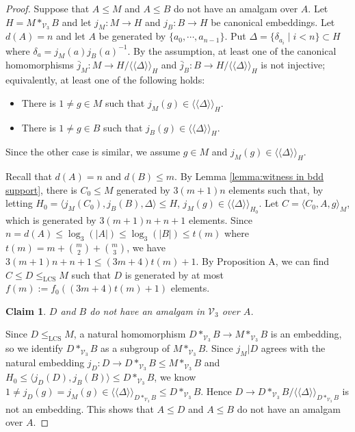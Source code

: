 \documentclass[11pt,reqno]{article}
\newtheorem{claim}{Claim}[theorem]
\theoremstyle{definition}
\theoremstyle{remark}
\newcommand{\LCS}{\mathrm{LCS}}
\newcommand{\llangle}{\langle\!\langle}
\newcommand{\rrangle}{\rangle\!\rangle}
\begin{document}
\begin{proof}
Suppose that $A\leq M$ and $A\leq B$ do not have an amalgam over $A$. 
Let $H=M*_{\mathcal V_3}B$ and let $j_M:M\to H$ and $j_B:B\to H$ be canonical embeddings.
Let $d(A)=n$ and let $A$ be generated by $\{a_0,\cdots, a_{n-1}\}$. 
Put $\Delta=\{\delta_{a_i}\mid i< n\}\subset H$ where $\delta_a=j_M(a)j_B(a)^{-1}$.
By the assumption, at least one of the canonical homomorphisms $\bar j_M:M\to H/\llangle \Delta\rrangle_H$ and $\bar j_B:B\to H/\llangle \Delta \rrangle_H$ is not injective; equivalently, at least one of the following holds:
\begin{itemize}
    \item There is $1\neq g\in M$ such that $j_M(g)\in \llangle \Delta \rrangle_H$.
    \item There is $1\neq g\in B$ such that $j_B(g)\in \llangle \Delta \rrangle_H$.
\end{itemize}
Since the other case is similar, we assume $g\in M$ and $j_M(g)\in \llangle \Delta \rrangle_H$.

Recall that $d(A)=n$ and $d(B)\leq m$.
By Lemma \ref{lemma:witness in bdd support},
there is $C_0\leq M$ generated by $3(m+1)n$ elements such that, by letting $H_0=\langle j_M(C_0),j_B(B),\Delta\rangle \leq H$, $j_M(g)\in \llangle \Delta\rrangle_{H_0}$.
Let $C=\langle C_0,A,g\rangle_M$, which is generated by $3(m+1)n+n+1$ elements.
Since $n= d(A)\leq \log_3(|A|) \leq \log_3(|B|) \leq t(m)$ where $t(m)=m+\binom m2+\binom m3$,
we have $3(m+1)n+n+1\leq (3m+4)t(m)+1$.
By Proposition A, we can find $C\leq D\leq_\LCS M$ such that $D$ is generated by at most $f(m):=f_0((3m+4)t(m)+1)$ elements.

\begin{claim}
$D$ and $B$ do not have an amalgam in $\mathcal V_3$ over $A$.
\end{claim}
Since $D\leq_\LCS M$, a natural homomorphism $D*_{\mathcal V_3}B \to M*_{\mathcal V_3}B$ is an embedding, so we identify $D*_{\mathcal V_3}B$ as a subgroup of $M*_{\mathcal V_3}B$.
Since $j_M|D$ agrees with the natural embedding $j_D:D\to D*_{\mathcal V_3}B\leq M*_{\mathcal V_3}B$ and $H_0\leq \langle j_D(D),j_B(B)\rangle\leq D*_{\mathcal V_3}B$, we know $1\neq j_D(g)=j_M(g)\in \llangle \Delta\rrangle_{D*_{\mathcal V_3}B}\leq D*_{\mathcal V_3}B$.
Hence $D\to D*_{\mathcal V_3}B/\llangle \Delta\rrangle_{D*_{\mathcal V_3}B}$ is not an embedding. This shows that $A\leq D$ and $A\leq B$ do not have an amalgam over $A$.
\end{proof}
\end{document}
